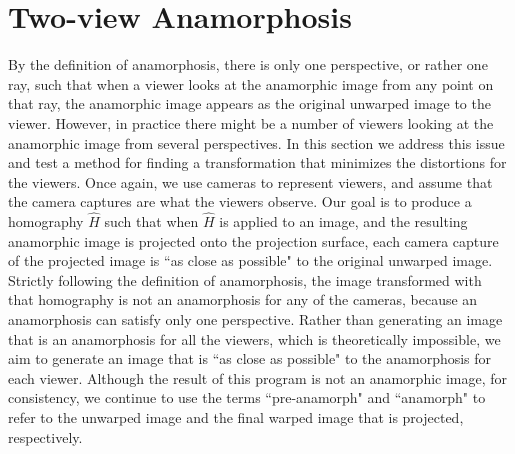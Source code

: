 \documentclass[11pt, oneside, reqno]{book}
\begin{document}


























\section{Two-view Anamorphosis}
\label{sec:2view}

By the definition of anamorphosis, there is only one perspective, or rather one ray, such that when a viewer looks at the anamorphic image from any point on that ray, the anamorphic image appears as the original unwarped image to the viewer. However, in practice there might be a number of viewers looking at the anamorphic image from several perspectives. In this section we address this issue and test a method for finding a transformation that minimizes the distortions for the viewers. Once again, we use cameras to represent viewers, and assume that the camera captures are what the viewers observe. Our goal is to produce a homography $\widehat{H}$ such that when $\widehat{H}$ is applied to an image, and the resulting anamorphic image is projected onto the projection surface, each camera capture of the projected image is ``as close as possible" to the original unwarped image. Strictly following the definition of anamorphosis, the image transformed with that homography is not an anamorphosis for any of the cameras, because an anamorphosis can satisfy only one perspective. Rather than generating an image that is an anamorphosis for all the viewers, which is theoretically impossible, we aim to generate an image that is ``as close as possible" to the anamorphosis for each viewer. Although the result of this program is not an anamorphic image,  for consistency, we continue to use the terms ``pre-anamorph" and ``anamorph" to refer to the unwarped image and the final warped image that is projected, respectively.
\end{document}
